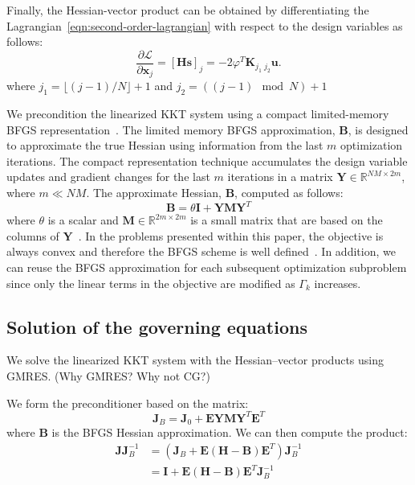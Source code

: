 \documentclass[12pt]{article}
\newcommand{\mb}{\mathbf}
\newcommand{\p}{\partial}
\newcommand{\f}{\frac}
\begin{document}
Finally, the Hessian-vector product can be obtained by differentiating
the Lagrangian~\eqref{eqn:second-order-lagrangian} with respect to the
design variables as follows:
\begin{equation}
  \f{\p \mathcal{L}}{\p \mb{x}_{j}} = \left[ \mb{H} \mb{s} \right]_{j} 
  = - 2 \varphi^{T} \mb{K}_{j_1\; j_2} \mb{u}.
\end{equation}
where $j_1 = \lfloor (j-1)/N \rfloor + 1$ and $j_2 = \left((j-1)\mod{N}\right) + 1$

We precondition the linearized KKT system using a compact
limited-memory BFGS
representation~\citep{Byrd:1994:quasi-Newton-LBFGS}.  The limited
memory BFGS approximation, $\mb{B}$, is designed to approximate the
true Hessian using information from the last $m$ optimization
iterations. The compact representation technique accumulates the
design variable updates and gradient changes for the last $m$
iterations in a matrix $\mb{Y} \in \mathbb{R}^{NM \times 2m}$, where
$m \ll NM$. The approximate Hessian, $\mb{B}$, computed as
follows:
%
\begin{equation}
  \label{eqn:quasi-Newton}
  \mb{B} = \theta \mb{I} + \mb{Y} \mb{M} \mb{Y}^{T}
\end{equation}
where $\theta$ is a scalar and $\mb{M} \in \mathbb{R}^{2m \times 2m}$
is a small matrix that are based on the columns of
$\mb{Y}$~\citep{Byrd:1994:quasi-Newton-LBFGS}. In the problems
presented within this paper, the objective is always convex and
therefore the BFGS scheme is well defined~\citep{Nocedal.Wright}.  In
addition, we can reuse the BFGS approximation for each subsequent
optimization subproblem since only the linear terms in the objective
are modified as $\Gamma_{k}$ increases.

\subsection{Solution of the governing equations}

We solve the linearized KKT system with the Hessian--vector products
using GMRES. (Why GMRES? Why not CG?)


We form the preconditioner based on the matrix:
%
\begin{equation}
  \mb{J}_{B} = \mb{J}_{0} + \mb{E} \mb{Y}\mb{M} \mb{Y}^{T} \mb{E}^{T}
\end{equation}
where $\mb{B}$ is the BFGS Hessian approximation. We can then compute
the product:
%
\begin{equation}
  \begin{aligned}
    \mb{J}\mb{J}_{B}^{-1} & = \left(\mb{J}_{B} + 
    \mb{E}\left(\mb{H} - \mb{B}\right)\mb{E}^{T}\right)\mb{J}_{B}^{-1} \\
    & = \mb{I} + \mb{E} \left(\mb{H} - \mb{B} \right) \mb{E}^{T} \mb{J}_{B}^{-1}
  \end{aligned}
\end{equation}
\end{document}
